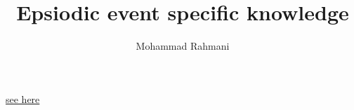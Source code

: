 \documentclass[a4paper]{article}
\title{Epsiodic event specific knowledge}
\date{}
\author{Mohammad Rahmani}
\begin{document}
   \maketitle

   \href{/nd_robotic_ai_learning_project/src/robot/part/mind/cognition/part/object_level/process/part/memory/part/memorizing/part/explicity/explicit/long_term/part/episodic/autobigraphical/part/event_specific_knowledge/event_specific_knowledge.tex}{see here}
   

   
   
\end{document}
